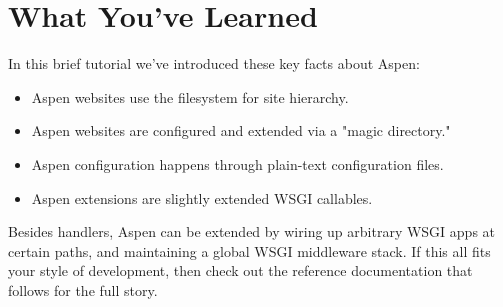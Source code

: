 \section{What You've Learned \label{tutorial-learned}}

In this brief tutorial we've introduced these key facts about Aspen:

\begin{itemize}
\item{Aspen websites use the filesystem for site hierarchy.}
\item{Aspen websites are configured and extended via a "magic directory."}
\item{Aspen configuration happens through plain-text configuration files.}
\item{Aspen extensions are slightly extended WSGI callables.}
\end{itemize}

Besides handlers, Aspen can be extended by wiring up arbitrary WSGI apps at
certain paths, and maintaining a global WSGI middleware stack. If this all fits
your style of development, then check out the reference documentation that
follows for the full story.
